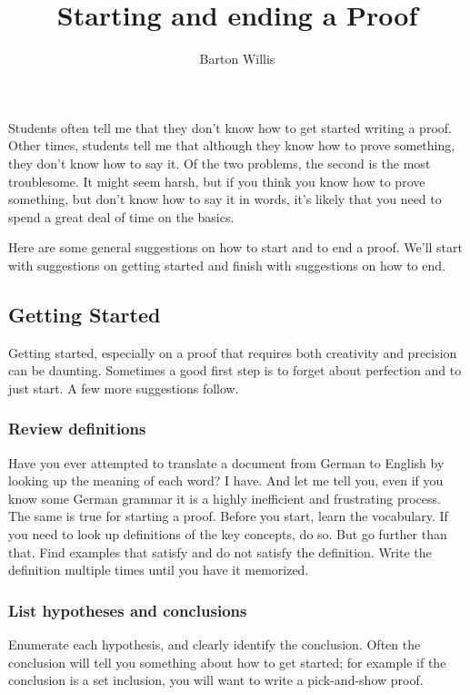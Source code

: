 \documentclass[12pt,fleqn]{article}
\title{Starting and ending a Proof}
\author{Barton Willis}
\newcounter{ex}\setcounter{ex}{0}
\newcounter{id}\setcounter{id}{0}
\newcounter{se}\setcounter{se}{0}
\begin{document}
\maketitle

Students often tell me that they don't know how to get started writing a proof. Other times, students tell me that although they know how to prove something, they don't know how to say it. Of the two problems, the second is the most troublesome. It
might seem harsh, but if you think you know how to prove something, but don't know how to say it in words, it's likely that 
you need to spend a great deal of time on the basics.

Here are some general suggestions on how to start and to end a proof. We'll start with suggestions on 
getting started and finish with suggestions on how to end.

\subsection{Getting Started}

Getting started, especially on a proof that requires both
creativity and precision can be daunting.  Sometimes a good first step is to forget about 
perfection and to just start. A few more suggestions follow.

\subsubsection{Review definitions} 

Have you ever attempted to translate a 
document from German to English by looking up the meaning of each 
word? I have. And let me tell you, even if you know some German grammar
 it is a highly inefficient and frustrating process. The same is true
 for starting a proof. Before you start, learn the vocabulary. If you 
 need to look up definitions of the key concepts, do so. But go further than that. 
 Find examples that satisfy and do not satisfy the definition. Write the
 definition multiple times until you have it memorized.

 \subsubsection{List hypotheses and conclusions} 

 Enumerate each hypothesis, and clearly
 identify the conclusion.  Often the conclusion will tell you something about how
 to get started; for example if the conclusion is a set inclusion, you will want
 to write a pick-and-show proof.
\end{document}
